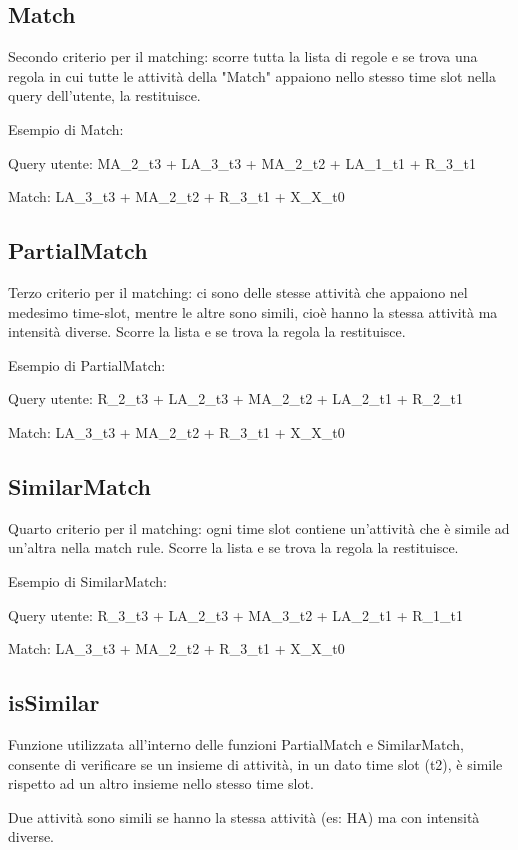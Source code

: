 \documentclass[a4paper]{article}
\begin{document}
\subsection{Match}
Secondo criterio per il matching: scorre tutta la lista di regole e se trova una regola in cui tutte le attività della "Match" appaiono nello stesso time slot nella query dell'utente, la restituisce.

Esempio di Match: 

Query utente: MA\_2\_t3 + LA\_3\_t3 + MA\_2\_t2 + LA\_1\_t1 + R\_3\_t1

Match: LA\_3\_t3 + MA\_2\_t2 + R\_3\_t1 + X\_X\_t0 

\subsection{PartialMatch}
Terzo criterio per il matching: ci sono delle stesse attività che appaiono nel medesimo time-slot, mentre le altre sono simili, cioè hanno la stessa attività ma intensità diverse. Scorre la lista e se trova la regola la restituisce.

Esempio di PartialMatch: 

Query utente: R\_2\_t3 + LA\_2\_t3 + MA\_2\_t2 + LA\_2\_t1 + R\_2\_t1

Match: LA\_3\_t3 + MA\_2\_t2 + R\_3\_t1 + X\_X\_t0 

\subsection{SimilarMatch}
Quarto criterio per il matching: ogni time slot contiene un'attività che è simile ad un'altra nella match rule.
Scorre la lista e se trova la regola la restituisce.


Esempio di SimilarMatch: 

Query utente: R\_3\_t3 + LA\_2\_t3 + MA\_3\_t2 + LA\_2\_t1 + R\_1\_t1

Match: LA\_3\_t3 + MA\_2\_t2 + R\_3\_t1 + X\_X\_t0


\subsection{isSimilar}
Funzione utilizzata all'interno delle funzioni PartialMatch e SimilarMatch, consente di verificare se un insieme di attività, in un dato time slot (t2), è simile rispetto ad un altro insieme nello stesso time slot.

Due attività sono simili se hanno la stessa attività (es: HA) ma con intensità diverse.
\end{document}
